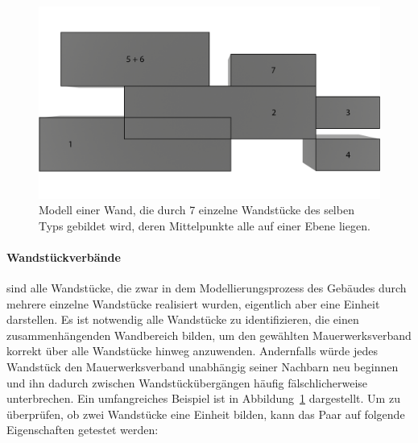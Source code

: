 \begin{figure}[ht]
    \centering
    \includegraphics[width=0.8\columnwidth]{fig/Real_Combination_Base_labeled.png}
    \caption{Modell einer Wand, die durch 7 einzelne Wandstücke des selben Typs gebildet wird, deren Mittelpunkte alle auf einer Ebene liegen.}\label{fig:concept:combination_example_base}
\end{figure}

\paragraph*{Wandstückverbände}\label{concept:combination_properties} sind alle Wandstücke,  die zwar in dem Modellierungsprozess des Gebäudes durch mehrere einzelne Wandstücke realisiert wurden, eigentlich aber eine Einheit darstellen. 
Es ist notwendig alle Wandstücke zu identifizieren, die einen zusammenhängenden Wandbereich bilden, um den gewählten Mauerwerksverband korrekt über alle Wandstücke hinweg anzuwenden.
Andernfalls würde jedes Wandstück den Mauerwerksverband unabhängig seiner Nachbarn neu beginnen und ihn dadurch zwischen Wandstückübergängen häufig fälschlicherweise unterbrechen.
Ein umfangreiches Beispiel ist in Abbildung~\ref*{fig:concept:combination_example_base} dargestellt.
Um zu überprüfen, ob zwei Wandstücke eine Einheit bilden, kann das Paar auf folgende Eigenschaften getestet werden:

